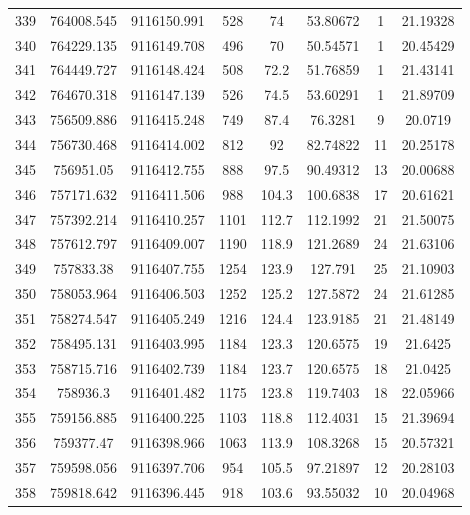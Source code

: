 \begin{longtable}{cccccccc}
339  & 764008.545      & 9116150.991      & 528     & 74    & 53.80672 & 1  & 21.19328 \\
340  & 764229.135      & 9116149.708      & 496     & 70    & 50.54571 & 1  & 20.45429 \\
341  & 764449.727      & 9116148.424      & 508     & 72.2  & 51.76859 & 1  & 21.43141 \\
342  & 764670.318      & 9116147.139      & 526     & 74.5  & 53.60291 & 1  & 21.89709 \\
343  & 756509.886      & 9116415.248      & 749     & 87.4  & 76.3281  & 9  & 20.0719  \\
344  & 756730.468      & 9116414.002      & 812     & 92    & 82.74822 & 11 & 20.25178 \\
345  & 756951.05       & 9116412.755      & 888     & 97.5  & 90.49312 & 13 & 20.00688 \\
346  & 757171.632      & 9116411.506      & 988     & 104.3 & 100.6838 & 17 & 20.61621 \\
347  & 757392.214      & 9116410.257      & 1101    & 112.7 & 112.1992 & 21 & 21.50075 \\
348  & 757612.797      & 9116409.007      & 1190    & 118.9 & 121.2689 & 24 & 21.63106 \\
349  & 757833.38       & 9116407.755      & 1254    & 123.9 & 127.791  & 25 & 21.10903 \\
350  & 758053.964      & 9116406.503      & 1252    & 125.2 & 127.5872 & 24 & 21.61285 \\
351  & 758274.547      & 9116405.249      & 1216    & 124.4 & 123.9185 & 21 & 21.48149 \\
352  & 758495.131      & 9116403.995      & 1184    & 123.3 & 120.6575 & 19 & 21.6425  \\
353  & 758715.716      & 9116402.739      & 1184    & 123.7 & 120.6575 & 18 & 21.0425  \\
354  & 758936.3        & 9116401.482      & 1175    & 123.8 & 119.7403 & 18 & 22.05966 \\
355  & 759156.885      & 9116400.225      & 1103    & 118.8 & 112.4031 & 15 & 21.39694 \\
356  & 759377.47       & 9116398.966      & 1063    & 113.9 & 108.3268 & 15 & 20.57321 \\
357  & 759598.056      & 9116397.706      & 954     & 105.5 & 97.21897 & 12 & 20.28103 \\
358  & 759818.642      & 9116396.445      & 918     & 103.6 & 93.55032 & 10 & 20.04968 \\

\end{longtable}
